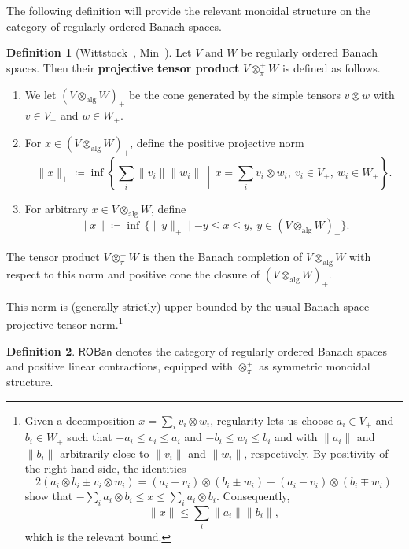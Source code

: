 \documentclass[11pt,onecolumn]{article}
\newcommand{\ROBan}{\mathsf{ROBan}}
\theoremstyle{plain}
\theoremstyle{remark}
\theoremstyle{definition}
\newtheorem{definition}[definition]{Definition}
\begin{document}
The following definition will provide the relevant monoidal structure on the category of regularly ordered Banach spaces.

\begin{definition}[{Wittstock~\cite{WittstockOrderedTensor}, Min~\cite[Section~3.1]{MinExponentialLaw}}]
	Let $V$ and $W$ be regularly ordered Banach spaces.
	Then their \textbf{projective tensor product} $V \otimes_\pi^+ W$ is defined as follows.
	\begin{enumerate}
		\item We let $(V \otimes_{\mathrm{alg}} W)_+$ be the cone generated by the simple tensors $v \otimes w$ with $v \in V_+$ and $w \in W_+$.
		\item For $x \in (V \otimes_{\mathrm{alg}} W)_+$, define the positive projective norm
			\[
				\|x\|_+ \coloneqq
				\inf
				\left\{
					\sum_i \|v_i\| \|w_i\|
					\,\middle|\,
					x = \sum_i v_i \otimes w_i,\ v_i \in V_+,\ w_i \in W_+
				\right\}.
			\]
		\item For arbitrary $x \in V \otimes_{\mathrm{alg}} W$, define
			\[
				\|x\| \coloneqq \inf \, \{ \|y\|_+ \mid -y \le x \le y,\ y \in (V \otimes_{\mathrm{alg}} W)_+ \}.
			\]
	\end{enumerate}
	The tensor product $V \otimes_\pi^+ W$ is then the Banach completion of $V \otimes_{\mathrm{alg}} W$ with respect to this norm and positive cone the closure of $(V \otimes_{\mathrm{alg}} W)_+$.
\end{definition}

This norm is (generally strictly) upper bounded by the usual Banach space projective tensor norm.\footnote{Given a decomposition $x=\sum_i v_i\otimes w_i$, regularity lets us choose $a_i\in V_+$ and $b_i\in W_+$ such that $-a_i\leq v_i\leq a_i$ and $-b_i\leq w_i\leq b_i$ and with $\|a_i\|$ and $\|b_i\|$ arbitrarily close to $\|v_i\|$ and $\|w_i\|$, respectively.
By positivity of the right-hand side, the identities
\[
	2(a_i\otimes b_i\pm v_i\otimes w_i)
	=
	(a_i+v_i)\otimes(b_i\pm w_i)
	+
	(a_i-v_i)\otimes(b_i\mp w_i)
\]
show that $-\sum_i a_i\otimes b_i\leq x\leq\sum_i a_i\otimes b_i$.
Consequently,
\[
	\|x\|
	\leq
	\sum_i\|a_i\|\|b_i\|,
\]
which is the relevant bound.}

\begin{definition}
	\label{def:roban}
	$\ROBan$ denotes the category of regularly ordered Banach spaces and positive linear contractions, equipped with $\otimes_\pi^+$ as symmetric monoidal structure.
\end{definition}
\end{document}
